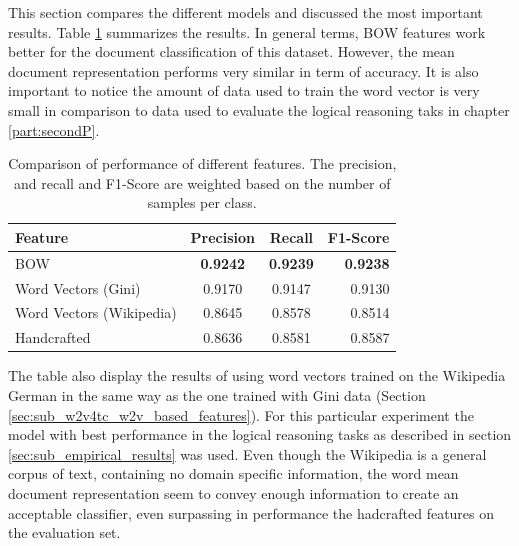 This section compares the different models and discussed the most important
results.  Table \ref{tab:w2v4tc_ginig_w2v_main_comparisson}
summarizes the results.  In general terms,  \ac{BOW} features work better for
the document classification of this dataset. However, the mean document
representation performs very similar in term of accuracy. It is also important to
notice the amount of data used to train the word vector is very
small in comparison to data used to evaluate the logical reasoning taks in
chapter \ref{part:secondP}. 

\begin{table}[ht!]
  \centering
  \caption{Comparison of performance of different features. The precision,
    and recall and F1-Score are weighted based on the number of samples per class.}
  \label{tab:w2v4tc_ginig_w2v_main_comparisson}
  
  \small
  \begin{tabular}{|l|c|c|r|}
    \hline
    Feature                   &  Precision  &  Recall  &  F1-Score  \\
    \hline
    \ac{BOW}                  &     \textbf{0.9242}  & \textbf{ 0.9239}  &   \textbf{ 0.9238}  \\
    Word Vectors (Gini)       &     0.9170  &  0.9147  &    0.9130  \\
    Word Vectors (Wikipedia)  &     0.8645  &  0.8578  &    0.8514  \\
    Handcrafted               &     0.8636  &  0.8581  &    0.8587  \\  
   \hline
  \end{tabular}
\end{table}

The table also display the results of using word vectors trained on the
Wikipedia German in the same way as the one trained with Gini data (Section
\ref{sec:sub_w2v4tc_w2v_based_features}). For this particular experiment the
model with best performance in the logical reasoning tasks as described in
section \ref{sec:sub_empirical_results} was used.  Even though  the Wikipedia is a
general corpus of text, containing no domain specific information,
the word mean document representation seem to convey enough information to create an
acceptable classifier, even surpassing in performance the hadcrafted features
on the evaluation set. 
 
 
